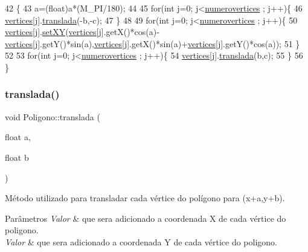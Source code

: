 \begin{DoxyCode}
42 \{
43     a=(float)a*(M\_PI/180);
44 
45     \textcolor{keywordflow}{for}(\textcolor{keywordtype}{int} j=0; j<\mbox{\hyperlink{class_poligono_adc59c72d363089aa8dc097e1f338875a}{numerovertices}} ; j++)\{
46         \mbox{\hyperlink{class_poligono_a18179d267bdf366f6bb00a4e1b16f1d7}{vertices}}[j].\mbox{\hyperlink{class_point_ad9676e36f3444534b609e3c68422239a}{translada}}(-b,-c);
47     \}
48 
49     \textcolor{keywordflow}{for}(\textcolor{keywordtype}{int} j=0; j<\mbox{\hyperlink{class_poligono_adc59c72d363089aa8dc097e1f338875a}{numerovertices}} ; j++)\{
50         \mbox{\hyperlink{class_poligono_a18179d267bdf366f6bb00a4e1b16f1d7}{vertices}}[j].\mbox{\hyperlink{class_point_ab5385c6d9bfa841e641e4709fc9f14cc}{setXY}}(\mbox{\hyperlink{class_poligono_a18179d267bdf366f6bb00a4e1b16f1d7}{vertices}}[j].getX()*cos(a)-
      \mbox{\hyperlink{class_poligono_a18179d267bdf366f6bb00a4e1b16f1d7}{vertices}}[j].getY()*sin(a),\mbox{\hyperlink{class_poligono_a18179d267bdf366f6bb00a4e1b16f1d7}{vertices}}[j].getX()*sin(a)+\mbox{\hyperlink{class_poligono_a18179d267bdf366f6bb00a4e1b16f1d7}{vertices}}[j].getY()*cos(a));
51     \}
52 
53     \textcolor{keywordflow}{for}(\textcolor{keywordtype}{int} j=0; j<\mbox{\hyperlink{class_poligono_adc59c72d363089aa8dc097e1f338875a}{numerovertices}} ; j++)\{
54         \mbox{\hyperlink{class_poligono_a18179d267bdf366f6bb00a4e1b16f1d7}{vertices}}[j].\mbox{\hyperlink{class_point_ad9676e36f3444534b609e3c68422239a}{translada}}(b,c);
55     \}
56 \}
\end{DoxyCode}
\mbox{\label{class_poligono_adbf605dfd0419b7301c9be0ec1dbe41b}} 
\subsubsection{\texorpdfstring{translada()}{translada()}}
{\footnotesize\ttfamily void Poligono\+::translada (\begin{DoxyParamCaption}\item[{float}]{a,  }\item[{float}]{b }\end{DoxyParamCaption})}



Método utilizado para transladar cada vértice do polígono para (x+a,y+b). 


\begin{DoxyParams}{Parâmetros}
{\em Valor} & que sera adicionado a coordenada X de cada vértice do poligono. \\
\hline
{\em Valor} & que sera adicionado a coordenada Y de cada vértice do poligono. \\
\hline
\end{DoxyParams}

